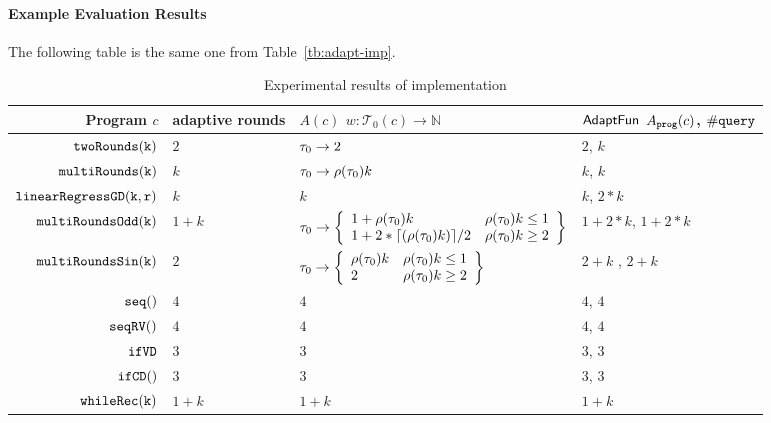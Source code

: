 %
\paragraph{Example Evaluation Results}
The following table is the same one from Table~\ref{tb:adapt-imp}.
\begin {table}[H]
    \caption{Experimental results of {\THESYSTEM} implementation}
        \begin{center}
        \centering
{\footnotesize
        \begin{tabular}{ r | p{12mm} | p{60mm} | p{30mm}}
         Program $c$ & adaptive \newline rounds & $A(c)$ \newline $w: \mathcal{T}_0(c) \to \mathbb{N}$ & $\textsf{AdaptFun}$ \newline $A_{\mathtt{prog}}(c)$, $\# {\tt query}$ \\ 
         \hline
         \hline
         $  \mathtt{twoRounds(k)}$ & $2$ & $\mathtt{\tau}_0 \to 2$ & $2$, $k$ \\
         $  \mathtt{multiRounds(k)}$ & $k$ & $\mathtt{\tau}_0 \to \rho(\mathtt{\tau}_0) k$ & $k$, $k$  \\
         $  \mathtt{linearRegressGD(k, r)}$ & $k$ & $k$ & $k$, $2 * k$  \\
         $  \mathtt{multiRoundsOdd(k)}$ & $1 + k$ 
   & $
\trace_0 \to 
\left\{\begin{array}{ll}
1 + \env(\trace_0) k & \env(\trace_0) k  \leq 1 \\
1 + 2 * \lceil{(\env(\trace_0) k)} \rceil / 2 & \env(\trace_0) k \geq 2
\end{array}\right\}
$ 
              & $1 + 2*k$, $1 + 2*k$  \\
         $  \mathtt{multiRoundsSin(k)}$    & $2$ 
    & $
        \trace_0 \to 
        \left\{\begin{array}{ll}
        \env(\trace_0) k & \env(\trace_0) k  \leq 1 \\
        2 & \env(\trace_0) k \geq 2
        \end{array}\right\}
        $ 
    & $2 + k$ , $2 + k$  \\
         $\mathtt{seq()}$ & $4$ & $4$ & $4$, $4$  \\ 
         $\mathtt{seqRV()}$ & $4$ & $4$ & $4$, $4$ \\  
         $ \mathtt{ifVD}$ & $3$ & $3$ & $3$, $3$ \\
         $\mathtt{ifCD()}$ & $3$ & $3$ & $3$, $3$  \\
         $ \mathtt{whileRec(k)}$ & $1+k$ & $1+k$ & $1+k$  \\

\end{tabular}}
\end{center}
\end{table}
